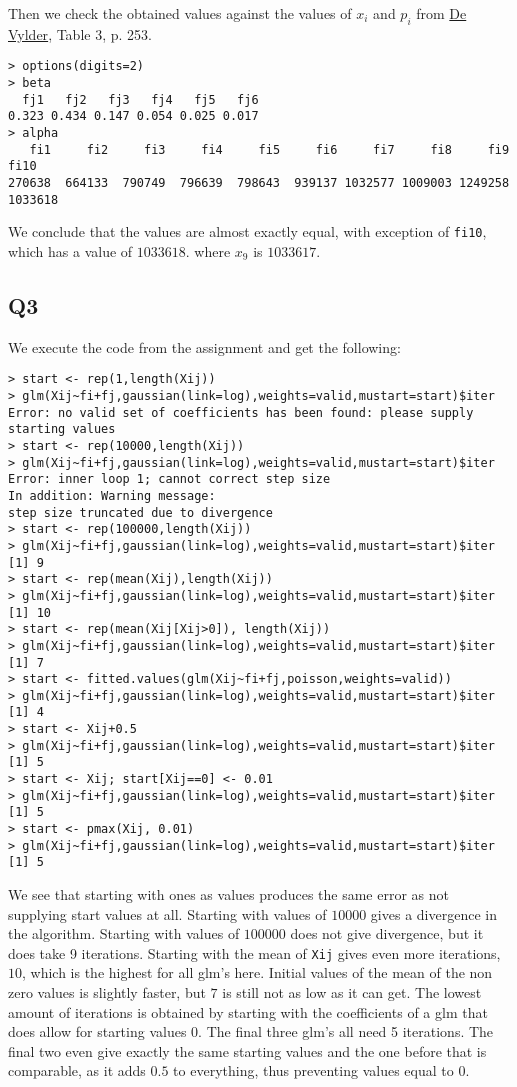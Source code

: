 \documentclass[11pt]{article}
\begin{document}
Then we check the obtained values against the values of $x_i$ and $p_i$ from \href{http://www1.fee.uva.nl/ke/act/people/kaas/DeVylder78.pdf}{De Vylder}, Table 3, p. 253.

\begin{verbatim}
> options(digits=2)
> beta
  fj1   fj2   fj3   fj4   fj5   fj6 
0.323 0.434 0.147 0.054 0.025 0.017 
> alpha
   fi1     fi2     fi3     fi4     fi5     fi6     fi7     fi8     fi9    fi10 
270638  664133  790749  796639  798643  939137 1032577 1009003 1249258 1033618
\end{verbatim}

We conclude that the values are almost exactly equal, with exception of \verb|fi10|, which has a value of $1033618$. where $x_9$ is $1033617$.

\subsection*{Q3}

We execute the code from the assignment and get the following:

\begin{verbatim}
> start <- rep(1,length(Xij))
> glm(Xij~fi+fj,gaussian(link=log),weights=valid,mustart=start)$iter
Error: no valid set of coefficients has been found: please supply starting values
> start <- rep(10000,length(Xij))
> glm(Xij~fi+fj,gaussian(link=log),weights=valid,mustart=start)$iter
Error: inner loop 1; cannot correct step size
In addition: Warning message:
step size truncated due to divergence 
> start <- rep(100000,length(Xij))
> glm(Xij~fi+fj,gaussian(link=log),weights=valid,mustart=start)$iter
[1] 9
> start <- rep(mean(Xij),length(Xij))
> glm(Xij~fi+fj,gaussian(link=log),weights=valid,mustart=start)$iter
[1] 10
> start <- rep(mean(Xij[Xij>0]), length(Xij))
> glm(Xij~fi+fj,gaussian(link=log),weights=valid,mustart=start)$iter
[1] 7
> start <- fitted.values(glm(Xij~fi+fj,poisson,weights=valid))
> glm(Xij~fi+fj,gaussian(link=log),weights=valid,mustart=start)$iter
[1] 4
> start <- Xij+0.5
> glm(Xij~fi+fj,gaussian(link=log),weights=valid,mustart=start)$iter
[1] 5
> start <- Xij; start[Xij==0] <- 0.01
> glm(Xij~fi+fj,gaussian(link=log),weights=valid,mustart=start)$iter
[1] 5
> start <- pmax(Xij, 0.01)
> glm(Xij~fi+fj,gaussian(link=log),weights=valid,mustart=start)$iter
[1] 5
\end{verbatim}

We see that starting with ones as values produces the same error as not supplying start values at all. Starting with values of $10000$ gives a divergence in the algorithm. Starting with values of $100000$ does not give divergence, but it does take 9 iterations. Starting with the mean of \verb|Xij| gives even more iterations, $10$, which is the highest for all glm's here. Initial values of the mean of the non zero values is slightly faster, but $7$ is still not as low as it can get. The lowest amount of iterations is obtained by starting with the coefficients of a glm that does allow for starting values $0$. The final three glm's all need 5 iterations. The final two even give exactly the same starting values and the one before that is comparable, as it adds $0.5$ to everything, thus preventing values equal to $0$.
\end{document}
